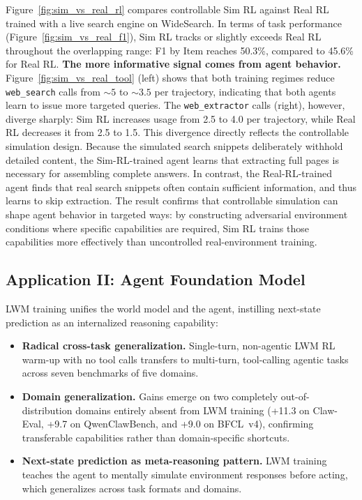 \documentclass{llmxive}
\begin{document}
Figure~\ref{fig:sim_vs_real_rl} compares controllable Sim RL against Real RL trained with a live search engine on WideSearch.
In terms of task performance (Figure~\ref{fig:sim_vs_real_f1}), Sim RL tracks or slightly exceeds Real RL throughout the overlapping range: F1 by Item reaches 50.3\%, compared to 45.6\% for Real RL.
\textbf{The more informative signal comes from agent behavior.}
Figure~\ref{fig:sim_vs_real_tool} (left) shows that both training regimes reduce \texttt{web\_search} calls from ${\sim}5$ to ${\sim}3.5$ per trajectory, indicating that both agents learn to issue more targeted queries.
The \texttt{web\_extractor} calls (right), however, diverge sharply: Sim RL increases usage from 2.5 to 4.0 per trajectory, while Real RL decreases it from 2.5 to 1.5.
This divergence directly reflects the controllable simulation design.
Because the simulated search snippets deliberately withhold detailed content, the Sim-RL-trained agent learns that extracting full pages is necessary for assembling complete answers.
In contrast, the Real-RL-trained agent finds that real search snippets often contain sufficient information, and thus learns to skip extraction.
The result confirms that controllable simulation can shape agent behavior in targeted ways: by constructing adversarial environment conditions where specific capabilities are required, Sim RL trains those capabilities more effectively than uncontrolled real-environment training.



\subsection{Application II: Agent Foundation Model}
\label{sec:app:foundation}

\begin{tcolorbox}[takeawaysbox]
\small
LWM training unifies the world model and the agent, instilling next-state prediction as an internalized reasoning capability:
\begin{itemize}[leftmargin=1.2em,itemsep=1pt,topsep=2pt]
\item \textbf{Radical cross-task generalization.} Single-turn, non-agentic LWM RL warm-up with no tool calls transfers to multi-turn, tool-calling agentic tasks across seven benchmarks of five domains.
\item \textbf{Domain generalization.} Gains emerge on two completely out-of-distribution domains entirely absent from LWM training (+11.3 on Claw-Eval, +9.7 on QwenClawBench, and +9.0 on BFCL~v4), confirming transferable capabilities rather than domain-specific shortcuts.
\item \textbf{Next-state prediction as meta-reasoning pattern.} LWM training teaches the agent to mentally simulate environment responses before acting, which generalizes across task formats and domains.
\end{itemize}
\end{tcolorbox}
\end{document}
